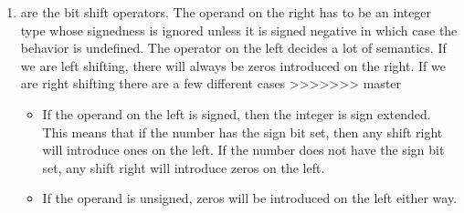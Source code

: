 \begin{enumerate}
	\item \keyword{>>/<<} are the bit shift operators. The operand on the right has to be an integer type whose signedness is ignored unless it is signed negative in which case the behavior is undefined. The operator on the left decides a lot of semantics. If we are left shifting, there will always be zeros introduced on the right. If we are right shifting there are a few different cases
>>>>>>> master
	      \begin{itemize}
		    \item If the operand on the left is signed, then the integer is sign extended.
          This means that if the number has the sign bit set, then any shift right will introduce ones on the left.
          If the number does not have the sign bit set, any shift right will introduce zeros on the left.
		      \item If the operand is unsigned, zeros will be introduced on the left either way.
	      \end{itemize}


\end{enumerate}
